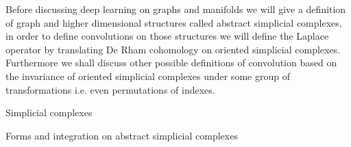 \documentclass[../main.tex]{subfiles}
\begin{document}
    Before discussing deep learning on graphs and manifolds we will give a definition of
    graph and higher dimensional structures called abstract simplicial complexes, in order 
    to define convolutions on those structures we will define the Laplace operator by 
    translating De Rham cohomology on oriented simplicial complexes.
    Furthermore we shall discuss other possible definitions of convolution based on the invariance of 
    oriented simplicial complexes under some group of transformations i.e. even permutations
    of indexes.     
    
    \begin{subsection}{Simplicial complexes}
            
    \end{subsection}
    \begin{subsection}{Forms and integration on abstract simplicial complexes}
            
    \end{subsection}
\end{document}
